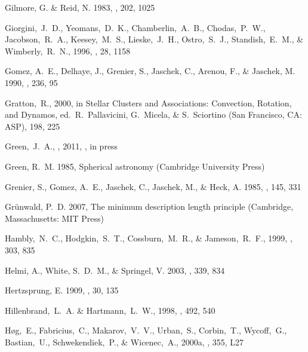 \begin{thebibliography}{99}
{Gilmore}, G. \& {Reid}, N. 1983, \mnras, 202, 1025

  Giorgini,~J.~D., Yeomans,~D.~K., Chamberlin,~A.~B., Chodas,~P.~W., Jacobson,~R.~A., Keesey,~M.~S., Lieske,~J.~H., Ostro,~S.~J., Standish,~E.~M., \& Wimberly,~R.~N., 1996, 
  \baas, 28, 1158

{Gomez}, A.~E., {Delhaye}, J., {Grenier}, S., {Jaschek}, C., {Arenou}, F., \&
  {Jaschek}, M. 1990, \aap, 236, 95

  Gratton,~R., 2000,
  in Stellar Clusters and Associations: Convection, Rotation, and Dynamos,
  ed.~R.~Pallavicini, G.~Micela, \& S.~Sciortino (San Francisco, CA: ASP),
  198, 225


  Green,~J.~A., \etal, 2011, \apj, in press

{Green}, R.~M. 1985, {Spherical astronomy} (Cambridge University Press)

{Grenier}, S., {Gomez}, A.~E., {Jaschek}, C., {Jaschek}, M., \& {Heck}, A.
  1985, \aap, 145, 331

{Gr{\"u}nwald}, P.~D. 2007, {The minimum description length principle}
  (Cambridge, Massachusetts: {MIT Press})

  Hambly,~N.~C., Hodgkin,~S.~T., Cossburn,~M.~R., \& Jameson,~R.~F., 1999,
  \mnras, 303, 835

{Helmi}, A., {White}, S.~D.~M., \& {Springel}, V. 2003, \mnras, 339, 834

{Hertzsprung}, E. 1909, \apj, 30, 135

  Hillenbrand,~L.~A. \& Hartmann,~L.~W., 1998,
  \apj, 492, 540

  H{\o}g,~E., Fabricius,~C., Makarov,~V.~V., Urban,~S., Corbin,~T., Wycoff,~G., Bastian,~U., Schwekendiek,~P., \& Wicenec,~A., 2000a,
  \aap, 355, L27


\end{thebibliography}
